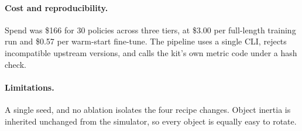 \documentclass[10pt]{nvidiaextabstract}
\begin{document}
\paragraph{Cost and reproducibility.} Spend was \$166 for 30 policies across three tiers, at
\$3.00 per full-length training run and \$0.57 per warm-start fine-tune. The
pipeline uses a single CLI, rejects incompatible upstream versions, and calls the kit's own
metric code under a hash check.

\paragraph{Limitations.} A single seed, and no ablation isolates the four recipe changes. Object
inertia is inherited unchanged from the simulator, so every object is equally easy to rotate.

\balance


\end{document}
